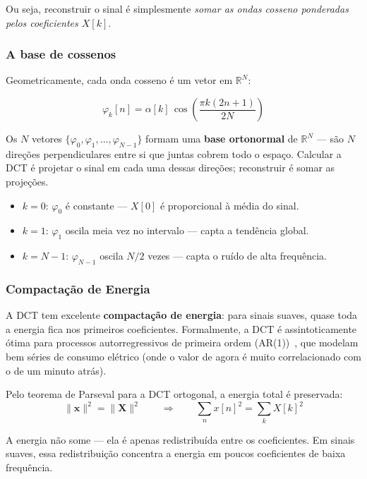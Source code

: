 \documentclass[12pt, a4paper]{article}
\begin{document}
Ou seja, reconstruir o sinal é simplesmente \emph{somar as ondas cosseno ponderadas pelos coeficientes $X[k]$}.

\subsubsection{A base de cossenos}

Geometricamente, cada onda cosseno é um vetor em $\mathbb{R}^N$:

\begin{equation}
    \varphi_k[n] = \alpha[k]\,\cos\!\left(\frac{\pi k (2n+1)}{2N}\right)
\end{equation}

Os $N$ vetores $\{\varphi_0, \varphi_1, \ldots, \varphi_{N-1}\}$ formam uma \textbf{base ortonormal} de $\mathbb{R}^N$ — são $N$ direções perpendiculares entre si que juntas cobrem todo o espaço. Calcular a DCT é projetar o sinal em cada uma dessas direções; reconstruir é somar as projeções.

\begin{itemize}
    \item $k=0$: $\varphi_0$ é constante — $X[0]$ é proporcional à média do sinal.
    \item $k=1$: $\varphi_1$ oscila meia vez no intervalo — capta a tendência global.
    \item $k = N-1$: $\varphi_{N-1}$ oscila $N/2$ vezes — capta o ruído de alta frequência.
\end{itemize}

\subsubsection{Compactação de Energia}

A DCT tem excelente \textbf{compactação de energia}: para sinais suaves, quase toda a energia fica nos primeiros coeficientes. Formalmente, a DCT é assintoticamente ótima para processos autorregressivos de primeira ordem (AR(1))~\cite{ahmed1974dct}, que modelam bem séries de consumo elétrico (onde o valor de agora é muito correlacionado com o de um minuto atrás).

Pelo teorema de Parseval para a DCT ortogonal, a energia total é preservada:
\begin{equation}
    \|\mathbf{x}\|^2 = \|\mathbf{X}\|^2
    \qquad\Longrightarrow\qquad
    \sum_n x[n]^2 = \sum_k X[k]^2
\end{equation}

A energia não some — ela é apenas redistribuída entre os coeficientes. Em sinais suaves, essa redistribuição concentra a energia em poucos coeficientes de baixa frequência.
\end{document}

